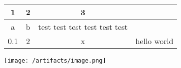 \documentclass[12pt,a4paper]{article}
\begin{document}
\begin{tabular}{|c|c|c|c|} \hline 
1 & 2 & 3 & \\ \hline 
a & b & test test test test test test & \\ \hline 
0.1 & 2 & x & hello world\\ \hline 
\end{tabular}
\begin{center}
\texttt{[image: /artifacts/image.png]}
\end{center}
\end{document}
